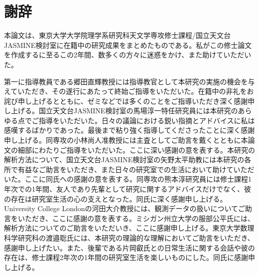 \documentclass[a4j,a4paper,11pt,oneside,openany,uplatex]{jsbook}
\begin{document}
 \setlength{\abovecaptionskip}{0pt}
 \setlength{\belowcaptionskip}{0pt}
 \captiondelim{: }


\renewcommand\arraystretch{1.1} %

%
\frontmatter

\tableofcontents

\mainmatter








\backmatter
\chapter*{謝辞}
本論文は、東京大学大学院理学系研究科天文学専攻修士課程/国立天文台JASMINE検討室に在籍中の研究成果をまとめたものである。私がこの修士論文を作成するに至るこの2年間、数多くの方々に迷惑をかけ、また助けていただいた。

第一に指導教員である郷田直輝教授には指導教官として本研究の実施の機会を与えていただき、その遂行にあたって終始ご指導をいただいた。在籍中の非礼をお詫び申し上げるとともに、ゼミなどでは多くのことをご指導いただき深く感謝申し上げる。国立天文台JASMINE検討室の馬場淳一特任研究員には本研究のあらゆる点でご指導をいただいた。日々の議論における鋭い指摘とアドバイスに私は感嘆するばかりであった。最後まで粘り強く指導してくださったことに深く感謝申し上げる。同専攻の小林尚人准教授には主査としてご助言を戴くとともに本論文の細部にわたりご指導をいただいた。ここに深い感謝の意を表する。本研究の解析方法について、国立天文台JASMINE検討室の矢野太平助教には本研究の各所で有益なご助言をいただき、また日々の研究室での生活において助けていただいた。ここに同氏への感謝の意を表する。同専攻の熊本淳研究員には修士課程1年次での1年間、友人であり先輩として研究に関するアドバイスだけでなく、彼の存在は研究室生活の心の支えとなった。同氏に深く感謝申し上げる。University College Londonの河田大介教授には、観測データの扱いについてご助言をいただき、ここに感謝の意を表する。ミシガン州立大学の服部公平氏には、解析方法についてのご助言をいただいき、ここに感謝申し上げる。東京大学数理科学研究科の渡邉聡氏には、本研究の理論的な理解においてご助言をいただき、感謝申し上げたい。また、後輩である片岡叡氏との日常生活に関する会話や彼の存在は、修士課程2年次の1年間の研究室生活を楽しいものにした。同氏に感謝申し上げる。

\appendix




\end{document}
